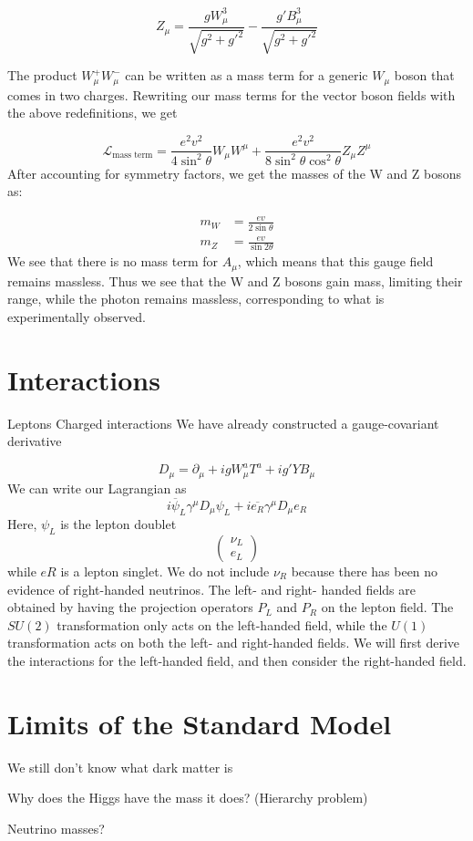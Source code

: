 \[Z_\mu = \frac{gW_\mu^3}{\sqrt{g^2+g'^2}}-\frac{g'B_\mu^3}{\sqrt{g^2+g'^2}}\]

The product $W_\mu^+W_\mu^-$ can be written as a mass term for a generic $W_\mu$ boson that comes in two charges. Rewriting our mass terms for the vector boson fields with the above redefinitions, we get

\[\mathcal{L}_{\text{mass term}}=\frac{e^2v^2}{4\sin^2\theta}W_\mu W^\mu+
\frac{e^2v^2}{8\sin^2\theta\cos^2\theta}Z_\mu Z^\mu\]
After accounting for symmetry factors, we get the masses of the W and Z bosons as:

\begin{align*}
  m_W &=\frac{ev}{2\sin\theta}\\
  m_Z &=\frac{ev}{\sin2\theta}
\end{align*}
We see that there is no mass term for $A_\mu$, which means that this gauge field remains massless. Thus we see that the W and Z bosons gain mass, limiting their range, while the photon remains massless, corresponding to what is experimentally observed.


\section{Interactions}

Leptons
Charged interactions
We have already constructed a gauge-covariant derivative 

$$D_\mu = \partial_\mu + igW_\mu^a T^a + ig'YB_\mu$$
We can write our Lagrangian as
$$i\overline{\psi}_L\gamma^\mu D_\mu\psi_L + i\overline{e_R}\gamma^\mu D_\mu e_R$$
Here, $\psi_L$ is the lepton doublet
$$\begin{pmatrix}\nu_L\\e_L\end{pmatrix}$$
while $eR$ is a lepton singlet. We do not include $\nu_R$ because there has been no evidence of right-handed neutrinos. The left- and right- handed fields are obtained by having the projection operators $P_L$ and $P_R$ on the lepton field. The $SU(2)$ transformation only acts on the left-handed field, while the $U(1)$ transformation acts on both the left- and right-handed fields. We will first derive the interactions for the left-handed field, and then consider the right-handed field. 

\section{Limits of the Standard Model}
We still don't know what dark matter is

Why does the Higgs have the mass it does? (Hierarchy problem)

Neutrino masses?
